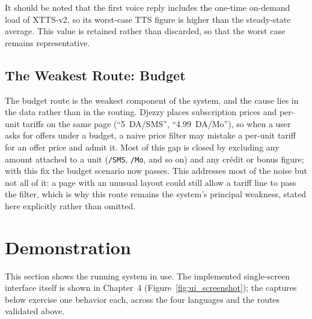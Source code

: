 \documentclass[12pt, a4paper]{report}
\newcommand{\humantext}[1]{#1}      %
\begin{document}
\humantext{It should be noted that the first voice reply includes the one-time on-demand load of XTTS-v2, so its worst-case TTS figure is higher than the steady-state average. This value is retained rather than discarded, so that the worst case remains representative.}

\subsection{The Weakest Route: Budget}
\humantext{The budget route is the weakest component of the system, and the cause lies in the data rather than in the routing. Djezzy places subscription prices and per-unit tariffs on the same page (``5~DA/SMS'', ``4.99~DA/Mo''), so when a user asks for offers under a budget, a naive price filter may mistake a per-unit tariff for an offer price and admit it. Most of this gap is closed by excluding any amount attached to a unit (\texttt{/SMS}, \texttt{/Mo}, and so on) and any crédit or bonus figure; with this fix the budget scenario now passes. This addresses most of the noise but not all of it: a page with an unusual layout could still allow a tariff line to pass the filter, which is why this route remains the system's principal weakness, stated here explicitly rather than omitted.}

\section{Demonstration}
\humantext{This section shows the running system in use. The implemented single-screen interface itself is shown in Chapter~4 (Figure~\ref{fig:ui_screenshot}); the captures below exercise one behavior each, across the four languages and the routes validated above.}
\end{document}
